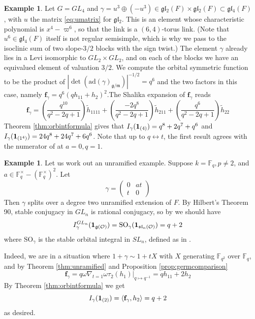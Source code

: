\documentclass{amsart}
\numberwithin{equation}{section}
\theoremstyle{definition}
\newtheorem{example}[lemma]{Example}%
\def\16{{\bf 16}}
\def\1{{\bf 1}}
\def\tilde{\widetilde}
\renewcommand{\th}{\tilde{h}}
\newcommand{\fgamma}{\mathbf{f}_{\gamma}}
\newcommand{\cO}{\mathcal{O}}
\newcommand{\fs}{\mathfrak{s}}
\newcommand{\fm}{\mathfrak{m}}
\newcommand{\fl}{\mathfrak{l}}
\newcommand{\fg}{\mathfrak{g}}
\newcommand{\F}{{\mathbb F}}
\newcommand{\ad}{\mathrm{ad}}
\begin{document}
\begin{example}
Let $G=GL_4$ and $\gamma=u^3\oplus(-u^3)\in\fg\fl_2(F)\times\fg\fl_2(F)\subset\fg\fl_4(F)$, with $u$ the matrix \eqref{eq:umatrix} for $\fg\fl_2$. This is an element whose characteristic polynomial is $x^4-\varpi^6$, so that the link is a $(6,4)$-torus link. (Note that $u^6\in\fg\fl_4(F)$ itself is not regular semisimple, which is why we pass to the isoclinic sum of two slope-$3/2$ blocks with the sign twist.) The element $\gamma$ already lies in a Levi isomorphic to $GL_2\times GL_2$, and on each of the blocks we have an equivalued element of valuation $3/2$. We compute the orbital symmetric function to be the product of $\left|\det(\ad(\gamma)_{\fg/\fm})\right|^{-1/2}=q^6$ and the two factors in this case, namely 
$\fgamma=q^6(qh_{11}+h_{2})^2$.The Shalika expansion of $\fgamma$ reads
 $$\fgamma=\left(\frac{q^{10}}{q^{2} - 2 q + 1}\right)\th_{1111} + \left(\frac{-2 q^8}{q^{2} - 2 q + 1}\right)\th_{211} + \left(\frac{q^{6}}{q^{2} - 2 q + 1}\right)\th_{22}$$
Theorem \ref{thm:orbintformula} gives that $I_\gamma(\1_{(4)})=q^8+2q^7+q^6$ and 
$I_\gamma(\1_{(1^4)})=24q^8+24q^7+6q^6$. Note that up to $q\leftrightarrow t$, the first result agrees with the numerator of \cite[Example 1.3.]{HM} at $a=0, q=1$.
\end{example}
\begin{example}
Let us work out an unramified example. 
Suppose $k=\F_q, p\neq 2$, and $a\in \F_q^\times-(\F_q^\times)^2$. Let 
$$\gamma=\begin{pmatrix}
0 & at \\ t & 0
\end{pmatrix}$$
Then $\gamma$ splits over a degree two unramified extension of $F$. By Hilbert's Theorem 90, stable conjugacy in $GL_n$ is rational conjugacy, so by \cite[(3.5.4)]{ZhiweiLects} we should have 
$$I_\gamma^{GL_n}(\1_{\fg(\cO)})=\mathrm{SO}_\gamma(\1_{\fs\fl_n(\cO)})=q+2$$ where $\mathrm{SO}_\gamma$ is the stable orbital integral in $SL_n$, defined as in \cite[Section 3.5.3.]{ZhiweiLects}.

Indeed, we are in a situation where $1+\gamma\sim 1+tX$ with $X$ generating $\F_{q^2}$ over $\F_q$, and by Theorem \ref{thm:unramified} and Proposition \ref{prop:germcomparison} 
$$\fgamma=q\omega \nabla_{t=1}\omega\tau_2(h_1)|_{q\mapsto q^{-1}}=qh_{11} + 2 h_{2}
$$
By Theorem \ref{thm:orbintformula} we get 
$$I_\gamma(\1_{(2)})=\langle \fgamma, h_2\rangle=q+2$$ as desired.


\end{example}
\end{document}
